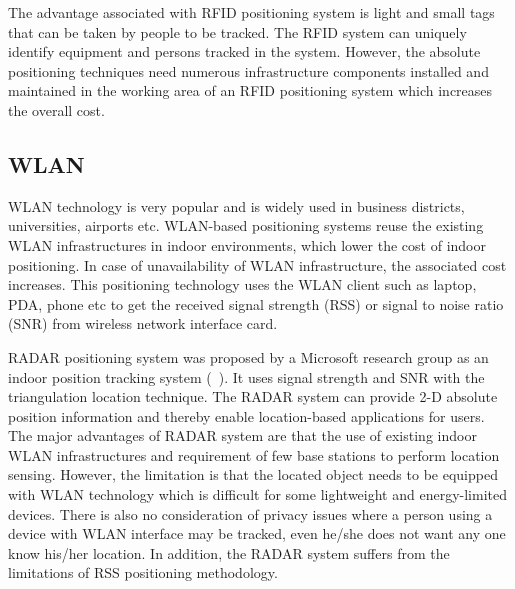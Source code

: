 The advantage associated with RFID positioning system is light and small
tags that can be taken by people to be tracked. The RFID
system can uniquely identify equipment and persons tracked
in the system. However, the absolute positioning
techniques need numerous infrastructure components installed
and maintained in the working area of an RFID positioning
system which increases the overall cost.


\subsection{WLAN}
\label{sec:wlan}

WLAN technology is very popular and 
is widely used in business districts, universities, airports etc. 
WLAN-based positioning systems reuse the
existing WLAN infrastructures in indoor environments, which
lower the cost of indoor positioning. In case of unavailability 
of WLAN infrastructure, the associated cost increases. 
This positioning technology uses the WLAN client such as 
laptop, PDA, phone etc to get the received signal strength (RSS) 
or signal to noise ratio (SNR) from wireless network interface card. 


RADAR positioning system was proposed
by a Microsoft research group as an indoor position tracking
system (~\citet{bahl00}). 
It uses signal strength and SNR with
the triangulation location technique. The RADAR system can
provide 2-D absolute position information and thereby enable
location-based applications for users.
The major advantages of RADAR system are that the
use of existing indoor WLAN infrastructures and requirement of
few base stations to perform location sensing. However, the
limitation is that the located object needs to be equipped with
WLAN technology which is difficult for some lightweight
and energy-limited devices. There is also no consideration
of privacy issues where a person 
using a device with WLAN interface may be tracked,
even he/she does not want any one know his/her location. In
addition, the RADAR system suffers from the limitations of
RSS positioning methodology.


